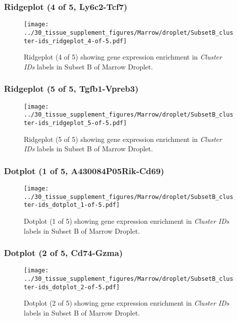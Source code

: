 \clearpage

\subsubsection{Ridgeplot (4 of 5, Ly6c2-Tcf7)}
\begin{figure}[h]
\centering
\texttt{[image: ../30\_tissue\_supplement\_figures/Marrow/droplet/SubsetB\_cluster-ids\_ridgeplot\_4-of-5.pdf]}

\caption{ Ridgeplot (4 of 5)  showing gene expression enrichment in \emph{Cluster IDs} labels in Subset B of Marrow Droplet. }
\end{figure}


\clearpage

\subsubsection{Ridgeplot (5 of 5, Tgfb1-Vpreb3)}
\begin{figure}[h]
\centering
\texttt{[image: ../30\_tissue\_supplement\_figures/Marrow/droplet/SubsetB\_cluster-ids\_ridgeplot\_5-of-5.pdf]}

\caption{ Ridgeplot (5 of 5)  showing gene expression enrichment in \emph{Cluster IDs} labels in Subset B of Marrow Droplet. }
\end{figure}


\clearpage

\subsubsection{Dotplot (1 of 5, A430084P05Rik-Cd69)}
\begin{figure}[h]
\centering
\texttt{[image: ../30\_tissue\_supplement\_figures/Marrow/droplet/SubsetB\_cluster-ids\_dotplot\_1-of-5.pdf]}

\caption{ Dotplot (1 of 5)  showing gene expression enrichment in \emph{Cluster IDs} labels in Subset B of Marrow Droplet. }
\end{figure}


\clearpage

\subsubsection{Dotplot (2 of 5, Cd74-Gzma)}
\begin{figure}[h]
\centering
\texttt{[image: ../30\_tissue\_supplement\_figures/Marrow/droplet/SubsetB\_cluster-ids\_dotplot\_2-of-5.pdf]}

\caption{ Dotplot (2 of 5)  showing gene expression enrichment in \emph{Cluster IDs} labels in Subset B of Marrow Droplet. }
\end{figure}


